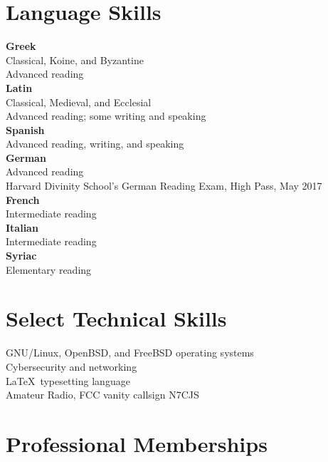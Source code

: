 \documentclass[letterpaper,12pt]{article}
\begin{document}
{{{{{{{%
\section*{Language Skills}

\textbf{Greek} \\ Classical, Koine, and Byzantine \\ Advanced reading \\ [.3cm]
%
\textbf{Latin} \\ Classical, Medieval, and Ecclesial \\ Advanced reading; some writing and speaking \\ [.3cm]
%
\textbf{Spanish} \\ Advanced reading, writing, and speaking \\ [.3cm]
%
\textbf{German} \\ Advanced reading \\
Harvard Divinity School's German Reading Exam, High Pass, May 2017 \\ [.3cm]
%
\textbf{French} \\ Intermediate reading \\ [.3cm]
%
\textbf{Italian} \\ Intermediate reading \\ [.3cm]
%
\textbf{Syriac} \\ Elementary reading

\section*{Select Technical Skills}

GNU/Linux, OpenBSD, and FreeBSD operating systems \\ [.3cm]
%
Cybersecurity and networking \\ [.3cm]
%
\LaTeX\ typesetting language \\ [.3cm]
%
Amateur Radio, FCC vanity callsign N7CJS

\section*{Professional Memberships}

}}}}}}}
\end{document}
